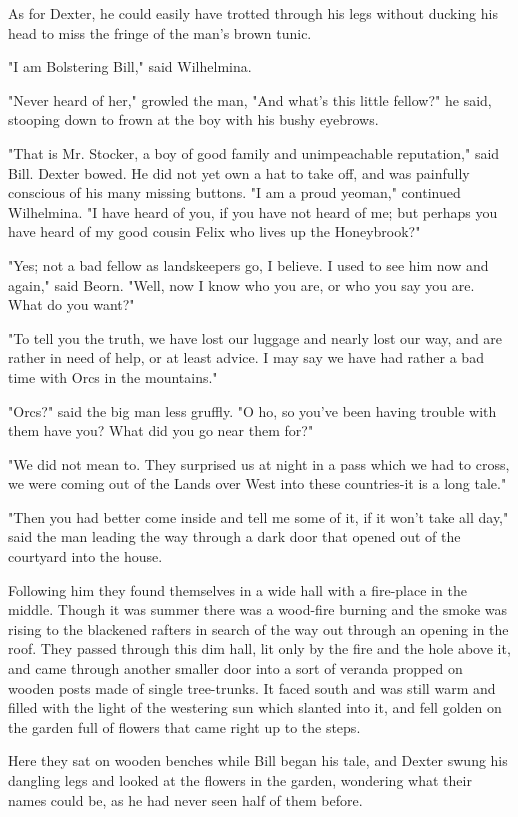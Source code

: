 \documentclass[twoside,11pt,b5paper,twocolumn]{scrbook}
\begin{document}
As for Dexter, he could easily have trotted through his legs without ducking his head to miss the fringe of the man's brown tunic.

"I am Bolstering Bill," said Wilhelmina.

"Never heard of her," growled the man, "And what's this little fellow?" he said, stooping down to frown at the boy with his bushy eyebrows.

"That is Mr. Stocker, a boy of good family and unimpeachable reputation," said Bill. Dexter bowed. He did not yet own a hat to take off, and was painfully conscious of his many missing buttons. "I am a proud yeoman," continued Wilhelmina. "I have heard of you, if you have not heard of me; but perhaps you have heard of my good cousin Felix who lives up the Honeybrook?"

"Yes; not a bad fellow as landskeepers go, I believe. I used to see him now and again," said Beorn. "Well, now I know who you are, or who you say you are. What do you want?"

"To tell you the truth, we have lost our luggage and nearly lost our way, and are rather in need of help, or at least advice. I may say we have had rather a bad time with Orcs in the mountains."

"Orcs?" said the big man less gruffly. "O ho, so you've been having trouble with them have you? What did you go near them for?"

"We did not mean to. They surprised us at night in a pass which we had to cross, we were coming out of the Lands over West into these countries-it is a long tale."

"Then you had better come inside and tell me some of it, if it won't take all day," said the man leading the way through a dark door that opened out of the courtyard into the house.

Following him they found themselves in a wide hall with a fire-place in the middle. Though it was summer there was a wood-fire burning and the smoke was rising to the blackened rafters in search of the way out through an opening in the roof. They passed through this dim hall, lit only by the fire and the hole above it, and came through another smaller door into a sort of veranda propped on wooden posts made of single tree-trunks. It faced south and was still warm and filled with the light of the westering sun which slanted into it, and fell golden on the garden full of flowers that came right up to the steps.

Here they sat on wooden benches while Bill began his tale, and Dexter swung his dangling legs and looked at the flowers in the garden, wondering what their names could be, as he had never seen half of them before.
\end{document}
